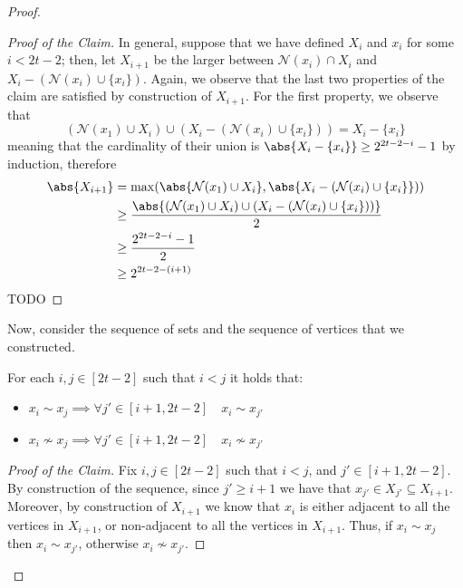 \documentclass[a4paper, 12pt]{report}
\begin{document}
\begin{proof}
\begin{proof}[Proof of the Claim]
            In general, suppose that we have defined $X_i$ and $x_i$ for some $i < 2t - 2$; then, let $X_{i + 1}$ be the larger between $\mathcal N(x_i) \cap X_i$ and $X_i - (\mathcal N(x_i) \cup \{x_i\})$. Again, we observe that the last two properties of the claim are satisfied by construction of $X_{i + 1}$. For the first property, we observe that $$(\mathcal N(x_1) \cup X_i) \cup (X_i - (\mathcal N(x_i) \cup \{x_i\})) = X_i - \{x_i\}$$ meaning that the cardinality of their union is $\abs{X_i - \{x_i\}} \ge 2^{2t - 2 - i} - 1$ by induction, therefore
            \begin{equation*}
                \begin{split}
                    \abs{X_{i + 1}} &= \max(\abs{\mathcal N(x_1) \cup X_i}, \abs{X_i - (\mathcal N(x_i) \cup \{x_i\}})) \\
                                    &\ge \dfrac{\abs{(\mathcal N(x_1) \cup X_i) \cup (X_i - (\mathcal N(x_i) \cup \{x_i\}))}}{2} \\
                                    &\ge \dfrac{2^{2t - 2 - i} - 1}{2} \\
                                    &\ge 2^{2t - 2 - (i + 1)}
                \end{split}
            \end{equation*}
            TODO 
        \end{proof}

        Now, consider the sequence of sets and the sequence of vertices that we constructed.

         For each $i, j \in [2t - 2]$ such that $i < j$ it holds that:

        \begin{itemize}
            \item $x_i \sim x_j \implies \forall j' \in [i + 1, 2t - 2] \quad x_i \sim x_{j'}$
            \item $x_i \nsim x_j \implies \forall j' \in [i + 1, 2t - 2] \quad x_i \nsim x_{j'}$
        \end{itemize}

        \begin{proof}[Proof of the Claim]
            Fix $i, j \in [2t- 2]$ such that $i < j$, and $j' \in [i + 1, 2t - 2]$. By construction of the sequence, since $j' \ge i + 1$ we have that $x_{j'} \in X_{j'} \subseteq X_{i+1}$. Moreover, by construction of $X_{i + 1}$ we know that $x_i$ is either adjacent to all the vertices in $X_{i +1}$, or non-adjacent to all the vertices in $X_{i +1}$. Thus, if $x_i \sim x_j$ then $x_i \sim x_{j'}$, otherwise $x_i \nsim x_{j'}$.
        \end{proof}


\end{proof}
\end{document}
